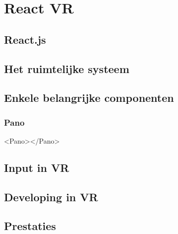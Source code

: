 \chapter{React VR}
\label{ch:react-vr}

\section{React.js}
\label{sec:reactjs}

\section{Het ruimtelijke systeem}
\label{sec:ruimtelijk-systeem}

\section{Enkele belangrijke componenten}
\label{sec:reactvr-componenten}
\subsection{Pano}
<Pano></Pano>

\section{Input in VR}
\label{sec:input-vr}

\section{Developing in VR}
\label{sec:developing-vr}

\section{Prestaties}
\label{sec:prestaties}
